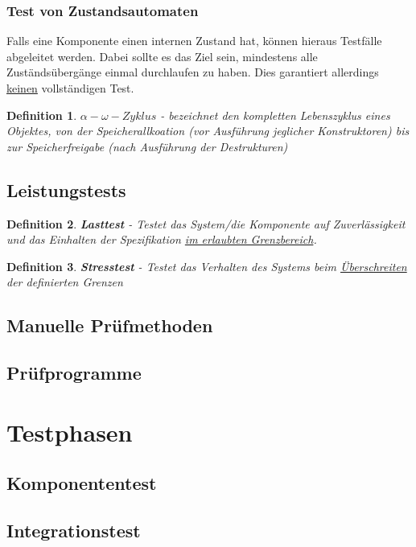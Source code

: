 \documentclass[a4paper]{article}
\theoremstyle{break}
\newtheorem{defi}{Definition}[section]
\begin{document}
        \subsubsection{Test von Zustandsautomaten}
        Falls eine Komponente einen internen Zustand hat, k\"onnen hieraus Testf\"alle abgeleitet werden. Dabei sollte es das Ziel sein, mindestens alle Zust\"ands\"uberg\"ange einmal durchlaufen zu haben. Dies garantiert allerdings \ul{keinen} vollst\"andigen Test.

        \begin{defi}
          \textbf{\(\alpha - \omega -Zyklus \)} - bezeichnet den kompletten Lebenszyklus eines Objektes, von der Speicherallkoation (vor Ausf\"uhrung jeglicher Konstruktoren) bis zur Speicherfreigabe (nach Ausf\"uhrung der Destrukturen)
        \end{defi}
        
        
        \subsection{Leistungstests}
        \begin{defi}
          \textbf{Lasttest} - Testet das System/die Komponente auf Zuverl\"assigkeit und das Einhalten der Spezifikation \ul{im erlaubten Grenzbereich}.
        \end{defi}

        \begin{defi}
          \textbf{Stresstest} - Testet das Verhalten des Systems beim \ul{\"Uberschreiten} der definierten Grenzen
        \end{defi}
        
        
\subsection{Manuelle Prüfmethoden}
\subsection{Prüfprogramme}
\section{Testphasen}
\subsection{Komponententest}
\subsection{Integrationstest}
\end{document}
